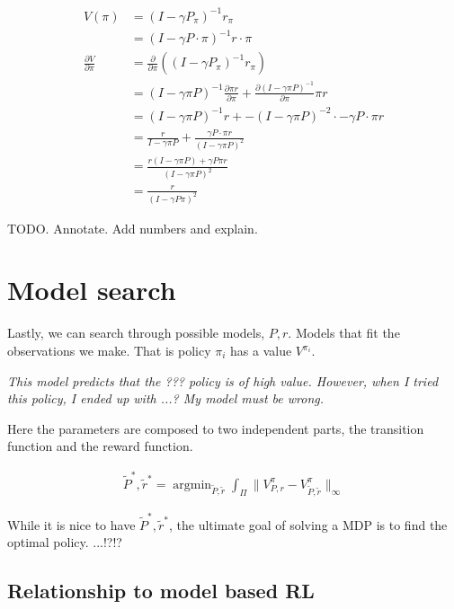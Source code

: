 \begin{align*}
V(\pi) &= (I − \gamma P_{\pi})^{−1}r_{\pi} \tag{value functional}\\
&= (I − \gamma P\cdot \pi)^{−1}r\cdot \pi \\
\frac{\partial V}{\partial \pi} &= \frac{\partial}{\partial \pi}((I-\gamma P_{\pi})^{-1} r_{\pi}) \\
&= (I-\gamma \pi P)^{-1} \frac{\partial \pi r}{\partial \pi}+   \frac{\partial (I-\gamma \pi P)^{-1}}{\partial \pi}\pi r\tag{product rule} \\
&= (I-\gamma \pi P)^{-1} r + -(I-\gamma \pi P)^{-2} \cdot -\gamma P\cdot \pi r\\
&= \frac{r}{I-\gamma \pi P} + \frac{ \gamma P\cdot \pi r}{(I-\gamma \pi P)^2} \tag{rewrite as fractions}\\
&= \frac{r(I-\gamma \pi P) + \gamma P \pi r}{(I-\gamma \pi P)^2} \tag{common demoninator}\\
& = \frac{r}{(I-\gamma P \pi)^2} \tag{cancel}
\end{align*}

TODO. Annotate. Add numbers and explain.



\section{Model search}

Lastly, we can search through possible models, $P, r$. Models that fit the
observations we make. That is policy $\pi_i$ has a value $V^{\pi_i}$.

\begin{displayquote}
  \textit{This model predicts that the ??? policy is of high value.
  However, when I tried this policy, I ended up with ...?
  My model must be wrong.}
\end{displayquote}

Here the parameters are composed to two independent parts, the transition function
and the reward function.

\begin{align}
\tilde P^{* }, \tilde r^{* } = \mathop{\text{argmin}}_{\tilde P, \tilde r} \int_{\Pi} \parallel V^{\pi}_{P, r} -V^{\pi}_{\tilde P, \tilde r} \parallel_\infty
\end{align}

While it is nice to have $\tilde P^{* }, \tilde r^{* }$, the ultimate goal of
solving a MDP is to find the optimal policy. ...!?!?

\subsection{Relationship to model based RL}

